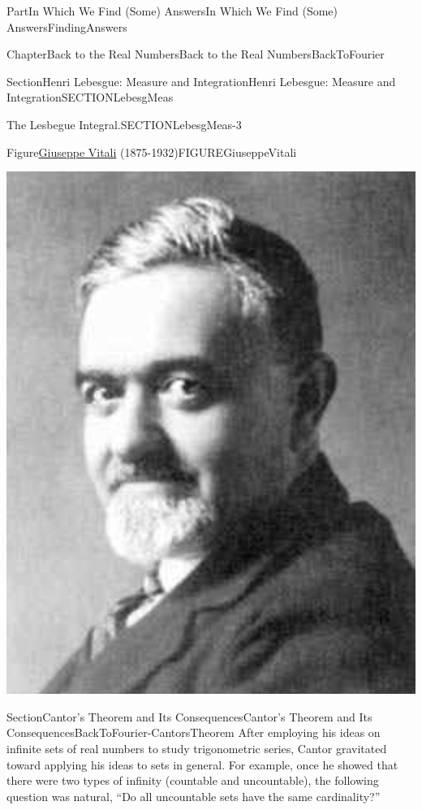 \documentclass[oneside,10pt,]{book}
\numberwithin{equation}{part}
\begin{document}
\begin{partptx}{Part}{In Which We Find (Some) Answers}{}{In Which We Find (Some) Answers}{}{}{FindingAnswers}
\begin{chapterptx}{Chapter}{Back to the Real Numbers}{}{Back to the Real Numbers}{}{}{BackToFourier}
\begin{sectionptx}{Section}{Henri Lebesgue: Measure and Integration}{}{Henri Lebesgue: Measure and Integration}{}{}{SECTIONLebesgMeas}
\begin{paragraphs}{The Lesbegue Integral.}{SECTIONLebesgMeas-3}
\begin{figureptx}{Figure}{\href{https://mathshistory.st-andrews.ac.uk/Biographies/Vitali/}{Giuseppe Vitali} (1875-1932)}{FIGUREGiuseppeVitali}{}
%
\begin{image}{0.325}{0.35}{0.325}{}%
\includegraphics[width=\linewidth]{external/images/Vitali.png}
\end{image}%
\tcblower
\end{figureptx}%
\end{paragraphs}%
\end{sectionptx}
%
%
\typeout{************************************************}
\typeout{************************************************}
%
\begin{sectionptx}{Section}{Cantor's Theorem and Its Consequences}{}{Cantor's Theorem and Its Consequences}{}{}{BackToFourier-CantorsTheorem}
After employing his ideas on infinite sets of real numbers to study trigonometric series, Cantor gravitated toward applying his ideas to sets in general.  For example, once he showed that there were two types of infinity (countable and uncountable), the following question was natural, ``Do all uncountable sets have the same cardinality?''%

\end{sectionptx}
\end{chapterptx}
\end{partptx}
\end{document}
